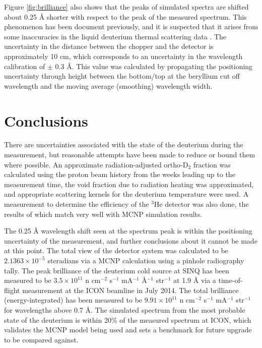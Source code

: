 \documentclass[5p,12pt]{elsarticle}
\begin{document}
Figure \ref{fig:brilliance} also shows that the peaks of simulated spectra are shifted about 0.25 {\AA} shorter with respect to the peak of the measured spectrum.  This phenomenon has been document previously, and it is suspected that it arises from some inaccuracies in the liquid deuterium thermal scattering data \cite{giller_thesis}.  The uncertainty in the distance between the chopper and the detector is approximately 10 cm, which corresponds to an uncertainty in the wavelength calibration of $\pm$ 0.3 {\AA}.  This value was calculated by propagating the positioning uncertainty through height between the bottom/top at the beryllium cut off wavelength and the moving average (smoothing) wavelength width.  

%
%
%
%
%

\section{Conclusions}
\label{sec:conclusions}

There are uncertainties associated with the state of the deuterium during the measurement, but reasonable attempts have been made to reduce or bound them where possible.  An approximate radiation-adjusted ortho-D$_2$ fraction was calculated using the proton beam history from the weeks leading up to the measurement time, the void fraction due to radiation heating was approximated, and appropriate scattering kernels for the deuterium temperature were used.  A measurement to determine the efficiency of the $^3$He detector was also done, the results of which match very well with MCNP simulation results.

The 0.25 {\AA} wavelength shift seen at the spectrum peak is within the positioning uncertainty of the measurement, and further conclusions about it cannot be made at this point.  The total view of the detector system was calculated to be $2.1363\times10^{-5}$ steradians via a MCNP calculation using a pinhole radiography tally.  The peak brilliance of the deuterium cold source at SINQ has been measured to be $3.5\times10^{11}$ n cm$^{-2}$ s$^{-1}$ mA$^{-1}$ \AA$^{-1}$ str$^{-1}$ at 1.9 {\AA} via a time-of-flight measurement at the ICON beamline in July 2014.  The total brilliance (energy-integrated) has been measured to be  $9.91\times10^{11}$  n cm$^{-2}$ s$^{-1}$ mA$^{-1}$ str$^{-1}$ for wavelengths above 0.7 {\AA}.  The simulated spectrum from the most probable state of the deuterium is within 20\% of the measured spectrum at ICON, which validates the MCNP model being used and sets a benchmark for future upgrade to be compared against.  
\end{document}
